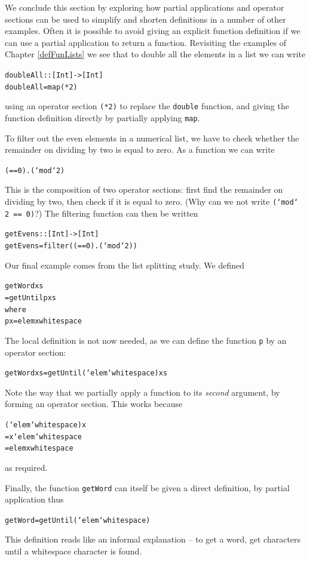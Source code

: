 We conclude this section by exploring how partial applications and operator sections can be
used to simplify and shorten definitions in a number of other examples. 
Often it is possible to avoid
giving an explicit function definition if we can use a partial application to
return a function. Revisiting the examples of Chapter \ref{defFunLists} we see that
to double all the elements in a list we can write
\begin{alltt}
doubleAll :: [Int] -> [Int]
doubleAll = map (*2)
\end{alltt}
using an operator section \texttt{(*2)} to replace the \texttt{double} function,
and giving the function definition directly by partially applying \texttt{map}.

To filter out the even elements in a numerical list, we have to check whether
the remainder on dividing by two is equal to zero. As a function we can write
\begin{alltt}
(==0).(`mod` 2)
\end{alltt}
This is the composition of two operator sections: first find the remainder on dividing by
two,
then check if it is equal to zero. (Why can we not write \texttt{(`mod` 2 ==
0)}?) The filtering function can then be written
\begin{alltt}
getEvens :: [Int] -> [Int]
getEvens = filter ((==0).(`mod` 2))
\end{alltt}
Our final example comes from the list splitting study. We defined
\begin{alltt}
getWord xs 
  = getUntil p xs
    where 
    p x = elem x whitespace
\end{alltt}
The local definition is not now needed, as we can define the function \texttt{p}
by an operator section:
\begin{alltt}
getWord xs = getUntil (`elem` whitespace) xs
\end{alltt}
Note the way that we partially apply a
function to its {\em second\/} argument, by forming an operator section. This
works because
\begin{alltt}
(`elem` whitespace) x
= x `elem` whitespace
= elem x whitespace
\end{alltt}
as required.

Finally, the 
function \texttt{getWord} can itself be given a direct definition,
by partial application thus
\begin{alltt}
getWord = getUntil (`elem` whitespace)
\end{alltt}
This definition reads like an informal explanation -- to get a word, get
characters until a whitespace character is found.
 


